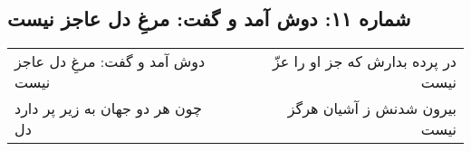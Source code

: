 \begin{center}
\section*{شماره ۱۱: دوش آمد و گفت: مرغِ دل عاجز نیست}
\label{sec:011}
\begin{longtable}{l p{0.5cm} r}
دوش آمد و گفت: مرغِ دل عاجز نیست
&&
در پرده بدارش که جز او را عزّ نیست
\\
چون هر دو جهان به زیر پر دارد دل
&&
بیرون شدنش ز آشیان هرگز نیست
\\
\end{longtable}
\end{center}
